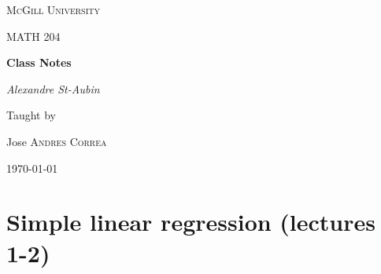 \documentclass[12pt]{article}
\theoremstyle{definition}
\theoremstyle{remark}
\begin{document}
\begin{titlepage}
	\centering
	{\scshape McGill University \par}
	\vspace{1cm}
	{\scshape\Large MATH 204\par}
	\vspace{1.5cm}
	{\huge\bfseries Class Notes\par}
	\vspace{2cm}
	{\Large\itshape Alexandre St-Aubin\par}
	\vfill
	Taught by \par
	Jose \textsc{Andres Correa}

	\vfill

	{\large \today\par}
\end{titlepage}

\tableofcontents
\newpage
\section{Simple linear regression (lectures 1-2)}
\end{document}
